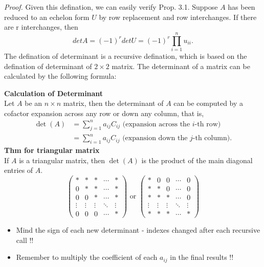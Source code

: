 \documentclass[10pt, a4paper]{article}
\begin{document}
\indent\textit{Proof.} Given this defination, we can easily verify Prop. 3.1. Suppose $A$ has been reduced to an echelon form $U$ by row replacement and row interchanges. If there are r interchanges, then $$
det A = (-1)^r det U = (-1)^r \prod_{i=1}^n u_{ii}.
$$
The defination of determinant is a recursive defination, which is based on the defination of determinant of $2\times 2$ matrix. The determinant of a matrix can be calculated by the following formula:
\begin{proposition}
    \textbf{Calculation of Determinant}\\
    Let $A$ be an $n\times n$ matrix, then the determinant of $A$ can be computed by a cofactor expansion across any row or down any column, that is, 
    \begin{align*}
        \det(A) & = \sum_{j=1}^n a_{ij}C_{ij} \text{ (expansion across the $i$-th row)} \\
                & = \sum_{i=1}^n a_{ij}C_{ij} \text{ (expansion down the $j$-th column)}.
    \end{align*}
    \textbf{Thm for triangular matrix}\\
    If $A$ is a triangular matrix, then $\det(A)$ is the product of the main diagonal entries of $A$.\[
        \begin{pmatrix}
            * & * & * &  \cdots & * \\
            0 & * & * & \cdots & * \\
            0 & 0 & * & \cdots & * \\
            \vdots & \vdots & \vdots & \ddots & \vdots \\
            0 & 0 & 0 & \cdots & *
        \end{pmatrix}
        \text{ or }
        \begin{pmatrix}
            * & 0 & 0 &  \cdots & 0 \\
            * & * & 0 & \cdots & 0 \\
            * & * & * & \cdots & 0 \\
            \vdots & \vdots & \vdots & \ddots & \vdots \\
            * & * & * & \cdots & *
        \end{pmatrix}
    \]
    \begin{itemize}
        \item Mind the sign of each new determinant - indexes changed after each recursive call !!
        \item Remember to multiply the coefficient of each $a_{ij}$ in the final results !!
    \end{itemize}
    
\end{proposition}
\end{document}
